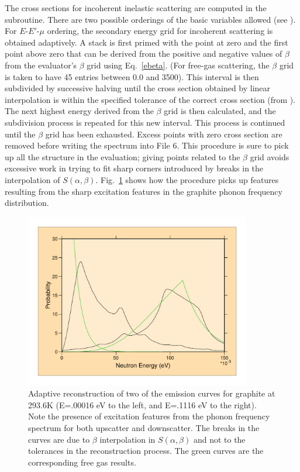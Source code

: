 The cross sections for incoherent inelastic scattering are computed
in the  subroutine.  There
are two possible orderings of the basic variables allowed (see
).  For $E$-$E'$-$\mu$ ordering, the secondary energy grid
for incoherent scattering is obtained adaptively.  A stack is first primed
with the point at zero and the first point above zero that can be derived
from the positive and negative values of $\beta$ from the evaluator's
$\beta$ grid using Eq.~\ref{ebeta}.  (For free-gas scattering, the
$\beta$ grid is taken to have 45 entries between 0.0 and 3500).
This interval is then subdivided by successive halving until the
cross section obtained by linear interpolation is within the specified
tolerance of the correct cross section (from
). The next
highest energy derived from the $\beta$ grid is then calculated,
and the subdivision process is repeated for this new interval.
This process is continued until the $\beta$ grid has been exhausted.
Excess points with zero cross section are removed before writing
the spectrum into File 6.  This procedure is sure to pick up all the
structure in the evaluation; giving points related to the $\beta$
grid avoids excessive work in trying to fit sharp corners introduced by
breaks in the interpolation of $S(\alpha,\beta)$.  Fig.~\ref{graph}
shows how the procedure picks up features resulting from the sharp
excitation features in the graphite phonon frequency distribution.

\begin{figure}[thb]\centering
\includegraphics[keepaspectratio, height=3.0in, angle=0]{figs/thermr2ack}
  \caption[Adaptive reconstruction of emission spectra (graphite)]{Adaptive
 reconstruction of two of the emission curves for graphite at 293.6K
 (E=.00016 eV to the left, and E=.1116 eV to the right).  Note the
 presence of excitation features from the phonon frequency spectrum
 for both upscatter and downscatter.  The breaks in the curves are due
 to $\beta$ interpolation in $S(\alpha,\beta)$ and not to the tolerances
 in the reconstruction process.  The green curves are the corresponding
 free gas results.}
\label{graph}
\end{figure}

